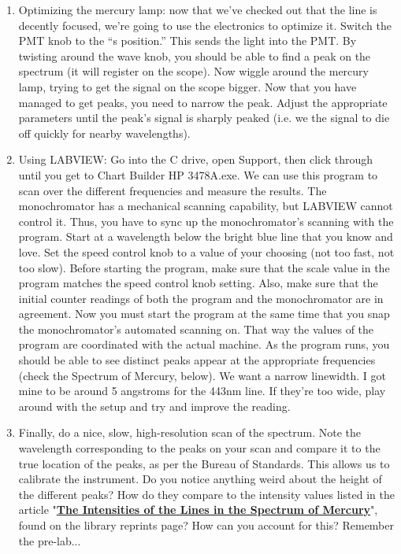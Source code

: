 \documentclass{../lab}
\begin{document}
\begin{enumerate}
    \item Optimizing the mercury lamp: now that we've checked out that the line is decently focused, we're going to use the electronics to optimize it. Switch the PMT knob to the ``s position.'' This sends the light into the PMT. By twisting around the wave knob, you should be able to find a peak on the spectrum (it will register on the scope). Now wiggle around the mercury lamp, trying to get the signal on the scope bigger. Now that you have managed to get peaks, you need to narrow the peak. Adjust the appropriate parameters until the peak's signal is sharply peaked (i.e. we the signal to die off quickly for nearby wavelengths).
    
    
    \item Using LABVIEW:
    Go into the C drive, open Support, then click through until you get to Chart Builder HP 3478A.exe. We can use this program to scan over the different frequencies and measure the results. The monochromator has a mechanical scanning capability, but LABVIEW cannot control it. Thus, you have to sync up the monochromator's scanning with the program. Start at a wavelength below the bright blue line that you know and love. Set the speed control knob to a value of your choosing (not too fast, not too slow). Before starting the program, make sure that the scale value in the program matches the speed control knob setting. Also, make sure that the initial counter readings of both the program and the monochromator are in agreement. Now you must start the program at the same time that you snap the monochromator's automated scanning on. That way the values of the program are coordinated with the actual machine. As the program runs, you should be able to see distinct peaks appear at the appropriate frequencies (check the Spectrum of Mercury, below). We want a narrow linewidth. I got mine to be around 5 angstroms for the 443nm line. If they're too wide, play around with the setup and try and improve the reading.
    
    \item Finally, do a nice, slow, high-resolution scan of the spectrum. Note the wavelength corresponding to the peaks on your scan and compare it to the true location of the peaks, as per the Bureau of Standards. This allows us to calibrate the instrument. Do you notice anything weird about the height of the different peaks? How do they compare to the intensity values listed in the article "\href{http://physics111.lib.berkeley.edu/Physics111/Reprints/ATM/ATM\%20Yellow\%20lines_p593_1.pdf}{\textbf{The Intensities of the Lines in the Spectrum of Mercury}}", found on the library reprints page? How can you account for this? Remember the pre-lab...
\end{enumerate}
\end{document}
